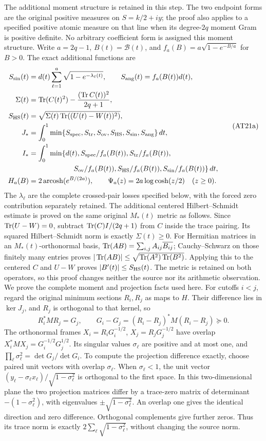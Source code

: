 The additional moment structure is retained in this step. The two
endpoint forms are the original positive measures on $S=k/2+iy$;
the proof also applies to a specified positive atomic measure on
that line when its degree-$2q$ moment Gram is positive definite.
No arbitrary coefficient form is assigned this moment structure.
Write $a=2q-1$, $B(t)=\mathcal B(t)$, and
$f_a(B)=a\sqrt{1-e^{-B/a}}$ for $B>0$. The exact additional
functions are
\[
\begin{aligned}
S_{\rm sin}(t)&=d(t)\sum_{\ell=1}^a\sqrt{1-e^{-\lambda_\ell(t)}},
\qquad S_{\rm ang}(t)=f_a(B(t))d(t),\\
\Sigma(t)&=\Tr(C(t)^2)-\frac{(\Tr C(t))^2}{2q+1},\\
S_{\rm HS}(t)&=\sqrt{\Sigma(t)\Tr((U(t)-W(t))^2)},\\
J_*&=\int_0^1\min\{S_{\rm spec},S_{\rm tr},S_{\rm ov},
                      S_{\rm HS},S_{\rm sin},S_{\rm ang}\}\,dt,\\
I_*&=\int_0^1\min\{d(t),S_{\rm spec}/f_a(B(t)),
                    S_{\rm tr}/f_a(B(t)),\\
&\hspace{22mm}S_{\rm ov}/f_a(B(t)),S_{\rm HS}/f_a(B(t)),S_{\rm sin}/f_a(B(t))\}\,dt,\\
H_a(B)&=2\operatorname{arcosh}(e^{B/(2a)}),\qquad
\Psi_a(z)=2a\log\cosh(z/2)\quad(z\ge0).
\end{aligned}\tag{AT21a}
\]
The $\lambda_\ell$ are the complete crossed-pair losses specified
below, with the forced zero contribution separately retained.
The additional centered Hilbert--Schmidt estimate is proved on the
same original $M_*(t)$ metric as follows. Since $\operatorname{Tr}(U-W)=0$,
subtract $\operatorname{Tr}(C)I/(2q+1)$ from $C$ inside the trace pairing.
Its squared Hilbert--Schmidt norm is exactly $\Sigma(t)\ge0$.
For Hermitian matrices in an $M_*(t)$-orthonormal basis,
$\operatorname{Tr}(AB)=\sum_{i,j}A_{ij}\overline{B_{ij}}$; Cauchy--Schwarz
on those finitely many entries proves
$|\operatorname{Tr}(AB)|\le\sqrt{\operatorname{Tr}(A^2)\operatorname{Tr}(B^2)}$. Applying this to the
centered $C$ and $U-W$ proves $|B'(t)|\le S_{\rm HS}(t)$.
The metric is retained on both operators, so this proof changes
neither the source nor its arithmetic observation.
We prove the complete moment and projection facts used here. For
cutoffs $i<j$, regard the original minimum sections $R_i,R_j$ as
maps to $H$. Their difference lies in $\ker J_j$, and $R_j$ is
orthogonal to that kernel, so
\[
R_i^*MR_j=G_j,\qquad
G_i-G_j=(R_i-R_j)^*M(R_i-R_j)\succeq0.
\]
The orthonormal frames $X_i=R_iG_i^{-1/2}$,
$X_j=R_jG_j^{-1/2}$ have overlap
$X_i^*MX_j=G_i^{-1/2}G_j^{1/2}$. Its singular values
$\sigma_\ell$ are positive and at most one, and
$\prod_\ell\sigma_\ell^2=\det G_j/\det G_i$.
To compute the projection difference exactly, choose paired unit
vectors with overlap $\sigma_\ell$. When $\sigma_\ell<1$, the
unit vector $(y_\ell-\sigma_\ell x_\ell)/\sqrt{1-\sigma_\ell^2}$
is orthogonal to the first space. In this two-dimensional plane the
two projection matrices differ by a trace-zero matrix of determinant
$-(1-\sigma_\ell^2)$, with eigenvalues
$\pm\sqrt{1-\sigma_\ell^2}$. An overlap one gives the identical
direction and zero difference. Orthogonal complements give further
zeros. Thus its trace norm is exactly
$2\sum_\ell\sqrt{1-\sigma_\ell^2}$, without changing the source norm.

